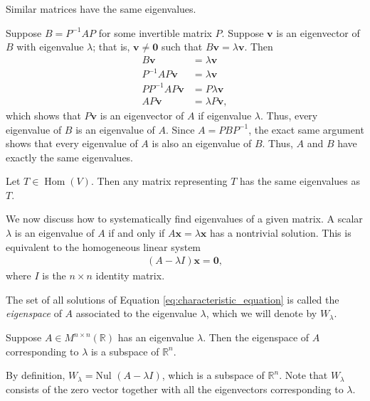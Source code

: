 \documentclass[12pt,letterpaper,reqno]{article}
\numberwithin{equation}{section}
\newcommand{\R}{\ensuremath{\mathbb R}}
\newcommand{\bv}{\mathbf{v}}
\newcommand{\bx}{\mathbf{x}}
\newcommand{\Nul}{\text{Nul }}
\DeclareMathOperator{\Hom}{Hom}
\begin{document}
\begin{thm}
Similar matrices have the same eigenvalues.	
\end{thm}

\begin{pf}
	Suppose $B=P^{-1}AP$ for some invertible matrix $P$. Suppose $\bv$ is an eigenvector of $B$ with eigenvalue $\lambda$; that is, $\bv \neq \mathbf{0}$ such that $B\bv=\lambda \bv$. Then
	\begin{align*}
		B\bv &=\lambda \bv \\
		P^{-1}AP\bv &=\lambda \bv \\
		PP^{-1}AP\bv &=P\lambda \bv \\
		AP\bv &=\lambda P\bv,
	\end{align*}
	which shows that $P\bv$ is an eigenvector of $A$ if eigenvalue $\lambda$. Thus, every eigenvalue of $B$ is an eigenvalue of $A$. Since $A=PBP^{-1}$, the exact same argument shows that every eigenvalue of $A$ is also an eigenvalue of $B$. Thus, $A$ and $B$ have exactly the same eigenvalues.
\end{pf}

\begin{cor}
Let $T \in \Hom(V)$. Then any matrix representing $T$ has the same eigenvalues as $T$.	
\end{cor}

We now discuss how to systematically find eigenvalues of a given matrix. A scalar $\lambda$ is an eigenvalue of $A$ if and only if $A\bx=\lambda\bx$ has a nontrivial solution. This is equivalent to the homogeneous linear system
\begin{align}\label{eq:characteristic_equation}
	(A-\lambda I)\bx=\mathbf{0},
\end{align}
where $I$ is the $n \times n$ identity matrix.

\begin{defn}[Eigenspace]
	The set of all solutions of Equation \eqref{eq:characteristic_equation} is called the \emph{eigenspace} of $A$ associated to the eigenvalue $\lambda$, which we will denote by $W_\lambda$.
\end{defn}

\begin{prop}
	Suppose $A \in M^{n \times n}(\R)$ has an eigenvalue $\lambda$. Then the eigenspace of $A$ corresponding to $\lambda$ is a subspace of $\R^n$.
\end{prop}

\begin{pf}
By definition, $W_\lambda=\Nul(A-\lambda I)$, which is a subspace of $\R^n$. Note that $W_\lambda$ consists of the zero vector together with all the eigenvectors corresponding to $\lambda$.	
\end{pf}
\end{document}

